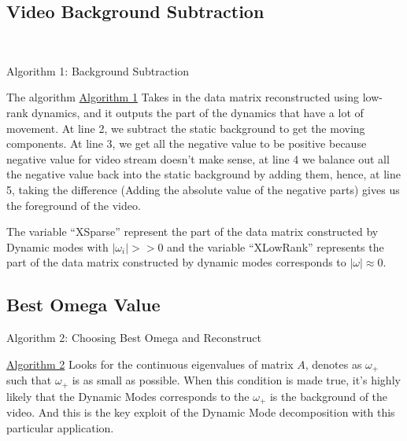 \documentclass{article}
\begin{document}
    \subsection*{Video Background Subtraction}
        \begin{algorithm}\label{alg:1}
            \begin{algorithmic}[h]
            \
            \end{algorithmic}\caption{Algorithm 1: Background Subtraction}
        \end{algorithm}
        The algorithm \hyperref[alg:1]{Algorithm 1} Takes in the data matrix reconstructed using low-rank dynamics, and it outputs the part of the dynamics that have a lot of movement. At line 2, we subtract the static background to get the moving components. At line 3, we get all the negative value to be positive because negative value for video stream doesn't make sense, at line 4 we balance out all the negative value back into the static background by adding them, hence, at line 5, taking the difference (Adding the absolute value of the negative parts) gives us the foreground of the video. 
        \par
        The variable ``XSparse'' represent the part of the data matrix constructed by Dynamic modes with $|\omega_i| >> 0$ and the variable ``XLowRank'' represents the part of the data matrix constructed by dynamic modes corresponds to $|\omega|\approx 0$. 
    \subsection*{Best Omega Value}
        \begin{algorithm}\label{alg:2}
            \begin{algorithmic}[h]
            \STATE{$\Omega$ := $\ln(\text{Diag}(\Lambda))/\Delta t$}
            \STATE{$\omega_+$, Idx = min($\Omega$)}
            \STATE{\textbf{Return: }Reconstructed, Idx}
            \end{algorithmic}\caption{Algorithm 2: Choosing Best Omega and Reconstruct}
        \end{algorithm}
        \hyperref[alg:2]{Algorithm 2} Looks for the continuous eigenvalues of matrix $A$, denotes as $\omega_+$ such that $\omega_+$ is as small as possible. When this condition is made true, it's highly likely that the Dynamic Modes corresponds to the $\omega_+$ is the background of the video. And this is the key exploit of the Dynamic Mode decomposition with this particular application.
        
\end{document}
